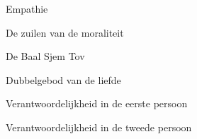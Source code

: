 \documentclass[main.tex]{subfiles}
\begin{document}
\begin{examenvraag}
    \begin{vraag}
        Empathie
    \end{vraag}

    \begin{antwoord}

    \end{antwoord}
\end{examenvraag}


\begin{examenvraag}
    \begin{vraag}
        De zuilen van de moraliteit
    \end{vraag}

    \begin{antwoord}

    \end{antwoord}
\end{examenvraag}


\begin{examenvraag}
    \begin{vraag}
        De Baal Sjem Tov
    \end{vraag}

    \begin{antwoord}

    \end{antwoord}
\end{examenvraag}


\begin{examenvraag}
    \begin{vraag}
        Dubbelgebod van de liefde
    \end{vraag}

    \begin{antwoord}

    \end{antwoord}
\end{examenvraag}


\begin{examenvraag}
    \begin{vraag}
        Verantwoordelijkheid in de eerste persoon
    \end{vraag}

    \begin{antwoord}

    \end{antwoord}
\end{examenvraag}


\begin{examenvraag}
    \begin{vraag}
        Verantwoordelijkheid in de tweede persoon
    \end{vraag}

    \begin{antwoord}

    \end{antwoord}
\end{examenvraag}
\end{document}
